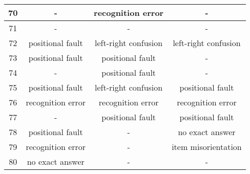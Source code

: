 \begin{table*}[ht]
{\begin{tabular}{|c|c|c|c|}
        70              & -                                 & recognition error    & -                                 \\ \hline
        71              & -                                 & -                    & -                                 \\ \hline
        72              & positional fault                 & left-right confusion & left-right confusion              \\ \hline
        73              & positional fault                 & positional fault    & -                                 \\ \hline
        74              & -                                 & positional fault    & -                                 \\ \hline
        75              & positional fault                 & left-right confusion & positional fault                 \\ \hline
        76              & recognition error                 & recognition error    & recognition error                 \\ \hline
        77              & -                                 & positional fault    & positional fault                 \\ \hline
        78              & positional fault                 & -                    & no exact answer                   \\ \hline
        79              & recognition error                 & -                    & item misorientation               \\ \hline
        80              & no exact answer                   & -                    & -                                 \\ \hline
        \end{tabular}%
        }
    \end{table*}